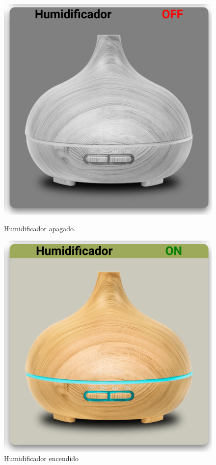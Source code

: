\documentclass{article}
\begin{document}
\begin{figure}[H]
    \centering
    \begin{minipage}[H]{0.49\textwidth}
        \centering
        \includegraphics[width=\textwidth]{images/humoff.png}
        \caption{Humidificador apagado.}
    \end{minipage}
    \hfill
    \begin{minipage}[H]{0.49\textwidth}
        \centering
        \includegraphics[width=\textwidth]{images/humon.png}
        \caption{Humidificador encendido}
    \end{minipage}
\end{figure}
\end{document}
